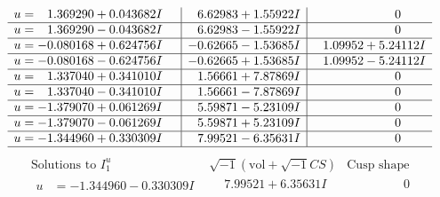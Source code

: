 \documentclass[1p]{elsarticle_modified}
\theoremstyle{definition}
\newcommand{\I}{\sqrt{-1}}
\begin{document}
$$\begin{array}{c|c|c}
\begin{aligned}
u &= \phantom{-}1.369290 + 0.043682 I\end{aligned}
 & \phantom{-}6.62983 + 1.55922 I & \phantom{-0.000000 } 0 \\ \hline\begin{aligned}
u &= \phantom{-}1.369290 - 0.043682 I\end{aligned}
 & \phantom{-}6.62983 - 1.55922 I & \phantom{-0.000000 } 0 \\ \hline\begin{aligned}
u &= -0.080168 + 0.624756 I\end{aligned}
 & -0.62665 - 1.53685 I & \phantom{-}1.09952 + 5.24112 I \\ \hline\begin{aligned}
u &= -0.080168 - 0.624756 I\end{aligned}
 & -0.62665 + 1.53685 I & \phantom{-}1.09952 - 5.24112 I \\ \hline\begin{aligned}
u &= \phantom{-}1.337040 + 0.341010 I\end{aligned}
 & \phantom{-}1.56661 + 7.87869 I & \phantom{-0.000000 } 0 \\ \hline\begin{aligned}
u &= \phantom{-}1.337040 - 0.341010 I\end{aligned}
 & \phantom{-}1.56661 - 7.87869 I & \phantom{-0.000000 } 0 \\ \hline\begin{aligned}
u &= -1.379070 + 0.061269 I\end{aligned}
 & \phantom{-}5.59871 - 5.23109 I & \phantom{-0.000000 } 0 \\ \hline\begin{aligned}
u &= -1.379070 - 0.061269 I\end{aligned}
 & \phantom{-}5.59871 + 5.23109 I & \phantom{-0.000000 } 0 \\ \hline\begin{aligned}
u &= -1.344960 + 0.330309 I\end{aligned}
 & \phantom{-}7.99521 - 6.35631 I & \phantom{-0.000000 } 0\\
 \hline 
 \end{array}$$\newpage$$\begin{array}{c|c|c}  
\text{Solutions to }I^u_{1}& \I (\text{vol} + \sqrt{-1}CS) & \text{Cusp shape}\\
 \hline 
\begin{aligned}
u &= -1.344960 - 0.330309 I\end{aligned}
 & \phantom{-}7.99521 + 6.35631 I & \phantom{-0.000000 } 0 \\ \hline\begin{aligned}

\end{aligned}
\end{array}$$
\end{document}
